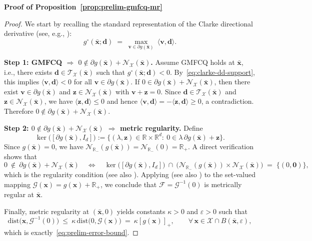 \documentclass[11pt]{article}
\def\bs{\boldsymbol}
\def\Re{\mathbb{R}}
\def\dist{\mathrm{dist}}
\def\N{\mathcal{N}}
\def\T{\mathcal{T}}
\def\X{\mathcal{X}}
\begin{document}
\noindent\textbf{Proof of Proposition~\ref{prop:prelim-gmfcq-mr}}
\begin{proof}
We start by recalling the standard representation of the Clarke directional derivative
(see, e.g., \cite[Proposition~2.1.2]{clarke1990optimization}):
\begin{equation}\label{eq:clarke-dd-support}
g^\circ(\bar{\bs{x}};\bs{d})\;=\;\max_{\bs{v}\in\partial g(\bar{\bs{x}})}\ \langle \bs{v},\bs{d}\rangle.
\end{equation}

\smallskip
\noindent\textbf{Step 1: GMFCQ $\Longrightarrow$ $0\notin \partial g(\bar{\bs{x}})+\N_{\X}(\bar{\bs{x}})$.}
Assume GMFCQ holds at $\bar{\bs{x}}$, i.e., there exists $\bs{d}\in\T_{\X}(\bar{\bs{x}})$ such that
$g^\circ(\bar{\bs{x}};\bs{d})<0$. By~\eqref{eq:clarke-dd-support}, this implies
$\langle \bs{v},\bs{d}\rangle<0$ for all $\bs{v}\in\partial g(\bar{\bs{x}})$.
If $0\in \partial g(\bar{\bs{x}})+\N_{\X}(\bar{\bs{x}})$, then there exist
$\bs{v}\in\partial g(\bar{\bs{x}})$ and $\bs{z}\in\N_{\X}(\bar{\bs{x}})$ with $\bs{v}+\bs{z}=0$.
Since $\bs{d}\in\T_{\X}(\bar{\bs{x}})$ and $\bs{z}\in\N_{\X}(\bar{\bs{x}})$, we have $\langle \bs{z},\bs{d}\rangle\le 0$ and hence
$\langle \bs{v},\bs{d}\rangle=-\langle \bs{z},\bs{d}\rangle\ge 0$, a contradiction.
Therefore $0\notin \partial g(\bar{\bs{x}})+\N_{\X}(\bar{\bs{x}})$.

\smallskip
\noindent\textbf{Step 2: $0\notin \partial g(\bar{\bs{x}})+\N_{\X}(\bar{\bs{x}})$ $\Longrightarrow$ metric regularity.}
Define
\[
\ker\!\bigl([\partial g(\bar{\bs{x}}), I_d]\bigr)
:=\bigl\{(\lambda,\bs{z})\in\Re\times\Re^d:\ 0\in \lambda\,\partial g(\bar{\bs{x}})+\bs{z}\bigr\}.
\]
Since $g(\bar{\bs{x}})=0$, we have $\N_{\Re_-}(g(\bar{\bs{x}}))=\N_{\Re_-}(0)=\Re_+$.
A direct verification shows that
\begin{equation*}
0\ \notin\ \partial g(\bar{\bs{x}})+\N_{\X}(\bar{\bs{x}})
\quad\Longleftrightarrow\quad
\ker\!\bigl([\partial g(\bar{\bs{x}}), I_d]\bigr)\ \cap\ \bigl(\N_{\Re_-}(g(\bar{\bs{x}}))\times \N_{\X}(\bar{\bs{x}})\bigr)
\;=\;\{(0,\bs{0})\},
\end{equation*}
which is the regularity condition \cite[Eq.~(2.8)]{burke1991exact} (see also \cite[Eq.~(33)]{borwein1986stability}).
Applying \cite[Thm.~2.4]{burke1991exact} (see also \cite[Thm.~3.2]{borwein1986stability}) to the set-valued mapping
$\mathcal{G}(\bs{x})=g(\bs{x})+\Re_+$, we conclude that $\mathcal{F}=\mathcal{G}^{-1}(0)$ is metrically regular at $\bar{\bs{x}}$.

Finally, metric regularity at $(\bar{\bs{x}},0)$ yields constants $\kappa>0$ and $\varepsilon>0$ such that
\[
\dist\bigl(\bs{x},\mathcal{G}^{-1}(0)\bigr)
\ \le\ \kappa\,\dist\bigl(0,\mathcal{G}(\bs{x})\bigr)
\ =\ \kappa [g(\bs{x})]_+,
\qquad \forall\,\bs{x}\in \X\cap B(\bar{\bs{x}},\varepsilon),
\]
which is exactly~\eqref{eq:prelim-error-bound}.
\end{proof}
\end{document}
